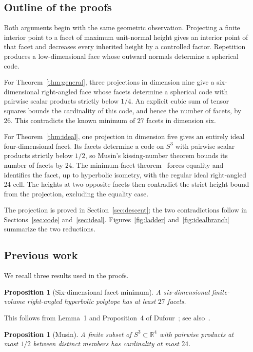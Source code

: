 \documentclass[11pt]{article}
\newtheorem{proposition}[theorem]{Proposition}
\theoremstyle{remark}
\newcommand{\RR}{\mathbb R}
\begin{document}
\subsection{Outline of the proofs}
Both arguments begin with the same geometric observation. Projecting
a finite interior point to a facet of maximum unit-normal height
gives an interior point of that facet and decreases every inherited
height by a controlled factor. Repetition produces a low-dimensional
face whose outward normals determine a spherical code.

For Theorem~\ref{thm:general}, three projections in dimension nine
give a six-dimensional right-angled face whose facets determine
a spherical code with pairwise scalar products strictly below $1/4$.
An explicit cubic sum of tensor squares bounds the cardinality of
this code, and hence the number of facets, by $26$. This contradicts
the known minimum of $27$ facets in dimension six.

For Theorem~\ref{thm:ideal}, one projection in dimension five gives
an entirely ideal four-dimensional facet. Its facets determine
a code on $S^3$ with pairwise scalar products strictly below $1/2$,
so Musin's kissing-number theorem bounds its number of facets by $24$.
The minimum-facet theorem~\cite[Theorem~4]{Kolpakov} forces equality
and identifies the facet, up to hyperbolic isometry, with the regular ideal right-angled
$24$-cell. The heights at two opposite facets then contradict the
strict height bound from the projection, excluding the equality case.

The projection is proved in Section~\ref{sec:descent}; the two
contradictions follow in Sections~\ref{sec:code} and~\ref{sec:ideal}.
Figures~\ref{fig:ladder} and~\ref{fig:idealbranch} summarize the two
reductions.

\subsection{Previous work}
We recall three results used in the proofs.

\begin{proposition}[Six-dimensional facet minimum]\label{prop:27}
A six-dimensional finite-volume right-angled hyperbolic polytope
has at least $27$ facets.
\end{proposition}

This follows from Lemma~1 and Proposition~4 of
Dufour~\cite{Dufour}; see also~\cite[Section~4]{Alex}.

\begin{proposition}[Musin]\label{prop:musin}
A finite subset of $S^3\subset\RR^4$ with pairwise products at most
$1/2$ between distinct members has cardinality at most $24$.
\end{proposition}
\end{document}
